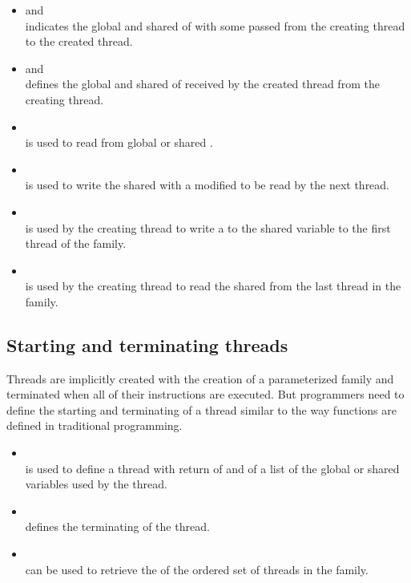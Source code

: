 \documentclass{article}
\begin{document}
\begin{itemize}

\item  and \\ indicates the global and shared  of  with some
     passed from the creating thread to the created thread.

\item  and \\ defines
    the global and shared  of  received by the created thread
    from the creating thread.

\item  \\ is used to read from global or shared
    .

\item  \\ is used to write the shared 
    with a modified  to be read by the next thread.

\item  \\ is used by the creating thread to write a
     to the shared variable to the first thread of the family.

\item  \\ is used by the creating thread to read the shared
     from the last thread in the family. 

\end{itemize}

\subsection*{Starting and terminating threads}

Threads are implicitly created with the creation of a parameterized family and
terminated when all of their instructions are executed. But programmers need to
define the starting and terminating of a thread similar to the way functions
are defined in traditional programming.

\begin{itemize}

\item \\ is used to define a thread with return of
     and  of a list of the global or shared variables used
    by the thread. 

\item  \\ defines the terminating of the thread. 

\item  \\ can be used to retrieve the  of the ordered
    set of threads in the family.

\end{itemize}
\end{document}
